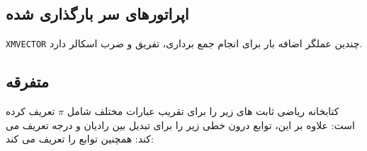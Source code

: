 \textbf{\vspace{-60pt}}
\subsection{\textbf{اپراتورهای سر بارگذاری شده}}
\label{subsec:1.6.5}
{
    \Large
    \begin{spacing}{1.5}
        \texttt{XMVECTOR} چندین عملگر اضافه بار برای انجام جمع برداری، تفریق و ضرب اسکالر دارد.
        \textbf{\vspace{6pt}}
        \lr{}
    \end{spacing}
}

\textbf{\vspace{-65pt}}
\subsection{\textbf{متفرقه}}
\label{subsec:1.6.6}
{
    \Large
    \begin{spacing}{1.5}
        کتابخانه ریاضی  ثابت های زیر را برای تقریب عبارات مختلف شامل $\pi$ تعریف کرده است:
        \textbf{\vspace{6pt}}
        \lr{}
        \textbf{\vspace{6pt}}
        علاوه بر این، توابع درون خطی زیر را برای تبدیل بین رادیان و درجه تعریف می کند:
        \textbf{\vspace{6pt}}
        \lr{}
        \textbf{\vspace{6pt}}
        همچنین توابع  را تعریف می کند:
        \textbf{\vspace{6pt}}
        \lr{}
    \end{spacing}
}

\textbf{\vspace{-60pt}}
